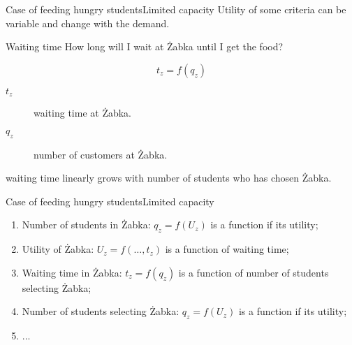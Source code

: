 \documentclass{beamer}
\newcommand\male{\fontsize{8}{7.2}\selectfont}
\begin{document}
\begin{frame}{Case of feeding hungry students}{Limited capacity}\male
Utility of some criteria can be variable and change with the demand.
\begin{block}{Waiting time}
How long will I wait at \.{Z}abka until I get the food?
\end{block}
\begin{equation*}
t_z=f(q_z)
\end{equation*}
\begin{description}
\item[$t_z$] waiting time at \.{Z}abka. 
\item[$q_z$] number of customers at \.{Z}abka.
\end{description}

\begin{center}
\end{center}
waiting time linearly grows with number of students who has chosen \.{Z}abka.
\end{frame}

\begin{frame}{Case of feeding hungry students}{Limited capacity}\male
\begin{enumerate}
\item Number of students in \.{Z}abka: $q_z = f(U_z)$ is a function if its utility; \pause
\item Utility of \.{Z}abka: $U_z = f(\dots, t_z)$ is a function of waiting time; \pause
\item Waiting time in \.{Z}abka: $t_z = f(q_z)$ is a function of number of students selecting \.{Z}abka; \pause
\item Number of students selecting \.{Z}abka: $q_z = f(U_z)$ is a function if its utility;
\item ... \pause
\end{enumerate}

\begin{center}
\end{center}
\end{frame}
\end{document}

